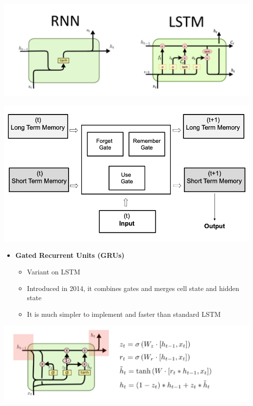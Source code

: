 \documentclass[11pt]{article}
\begin{document}
\begin{center}
\includegraphics[scale=0.4]{images/compare.png}
\end{center}
\begin{center}
\includegraphics[scale=0.7]{images/lstm.png}
\end{center}
\begin{itemize}
\item \textbf{Gated Recurrent Units (GRUs)}
\begin{itemize}
\item Variant on LSTM
\item Introduced in 2014, it combines gates and
merges cell state and hidden state
\item It is much simpler to implement and faster than standard LSTM
\end{itemize}
\end{itemize}
\begin{center}
\includegraphics[scale=0.5]{images/gru.png}
\end{center}
\end{document}
